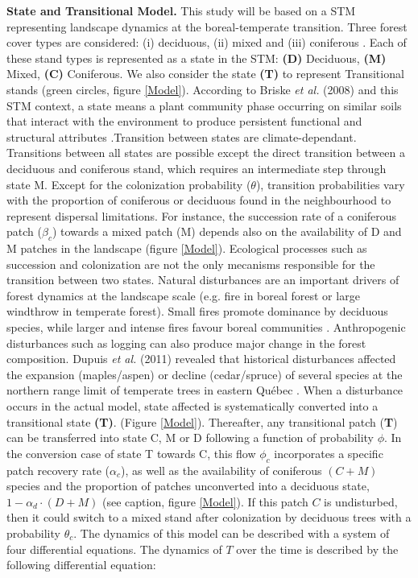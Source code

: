 \textbf{State and Transitional Model.} This study will be based on a STM
representing landscape dynamics at the boreal-temperate transition. Three
forest cover types are considered: (i) deciduous, (ii) mixed and (iii)
coniferous \cite{Fisichelli2013}.  Each of these stand types is represented as
a state in the STM: \textbf{(D)} Deciduous, \textbf{(M)} Mixed, \textbf{(C)}
Coniferous. We also consider the state \textbf{(T)} to represent Transitional
stands (green circles, figure \ref{Model}).  According to Briske\textit{ et
al.} (2008) and this STM context, a state means a plant community phase
occurring on similar soils that interact with the environment to produce
persistent functional and structural attributes \cite{Briske2008}.Transition
between states are climate-dependant. Transitions between all states are
possible except the direct transition between a deciduous and coniferous
stand, which requires an intermediate step through state M. Except for the
colonization probability ($\theta$), transition probabilities vary with the
proportion of coniferous or deciduous found in the  neighbourhood to represent
dispersal limitations. For instance, the succession rate of a coniferous patch
($\beta_c$) towards a mixed patch (M) depends also on the availability of D
and M patches in the landscape (figure \ref{Model}).  Ecological processes
such as succession and colonization are not the only mecanisms responsible for
the transition between two states. Natural disturbances are an important
drivers of forest dynamics at the landscape scale (e.g. fire in boreal forest
or large windthrow in temperate forest). Small fires promote dominance by
deciduous species, while larger and intense fires favour boreal communities
\cite{Bergeron2004}. Anthropogenic disturbances such as logging can also
produce major change in the forest composition. Dupuis \textit{et al.} (2011)
revealed that historical disturbances affected the  expansion (maples/aspen)
or decline (cedar/spruce) of several species at the northern range limit of
temperate trees in eastern Québec \cite{Dupuis2011}. When a disturbance occurs
in the actual model, state affected is systematically converted into a
transitional state \textbf{(T)}. (Figure \ref{Model}).  Thereafter, any
transitional patch (\textbf{T}) can be transferred into state C, M or D
following a function of probability $\phi$. In the conversion case of state T
towards C, this flow $\phi_c$ incorporates a specific patch recovery rate
($\alpha_c$), as well as the availability of coniferous $(C + M)$ species and
the proportion of patches unconverted into a deciduous state, $1- \alpha_d
\cdot (D + M)$ (see caption, figure \ref{Model}). If this patch $C$ is
undisturbed, then it could switch to a mixed stand after colonization by
deciduous trees with a probability $\theta_c$. The dynamics of this model can
be described with a system of four differential equations.  The dynamics of
$T$ over the time is described by the following differential equation:

